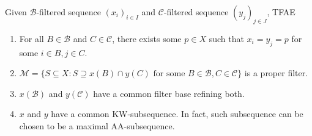 \documentclass{treatise}
\begin{document}
\begin{lemma}
Given $\mathcal{B}$-filtered sequence $(x_i)_{i \in I}$ and $\mathcal{C}$-filtered sequence $(y_j)_{j \in J}$, TFAE
\begin{enumerate}
    \item For all $B \in \mathcal{B}$ and $C \in \mathcal{C}$, there exists some $p \in X$ such that $x_i = y_j = p$ for some $i \in B, j \in C$.
    \item $\mathcal{M} = \{ S \subseteq X : S \supseteq x(B) \cap y(C) \mbox{ for some } B \in \mathcal{B}, C \in \mathcal{C} \}$ is a proper filter.
    \item $x(\mathcal{B})$ and $y(\mathcal{C})$ have a common filter base refining both.
    \item $x$ and $y$ have a common KW-subsequence. In fact, such subsequence can be chosen to be a maximal AA-subsequence.
\end{enumerate}
\end{lemma}
\end{document}

